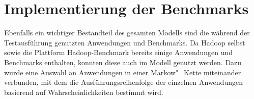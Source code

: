 \chapter{Implementierung der Benchmarks}\label{chap:benchmarks}

Ebenfalls ein wichtiger Bestandteil des gesamten Modells sind die während der Testausführung genutzten Anwendungen und Benchmarks. Da Hadoop selbst sowie die Plattform Hadoop-Benchmark bereits einige Anwendungen und Benchmarks enthalten, konnten diese auch im Modell genutzt werden. Dazu wurde eine Auswahl an Anwendungen in einer Markow"=Kette miteinander verbunden, mit dem die Ausführungsreihenfolge der einzelnen Anwendungen basierend auf Wahrscheinlichkeiten bestimmt wird.





